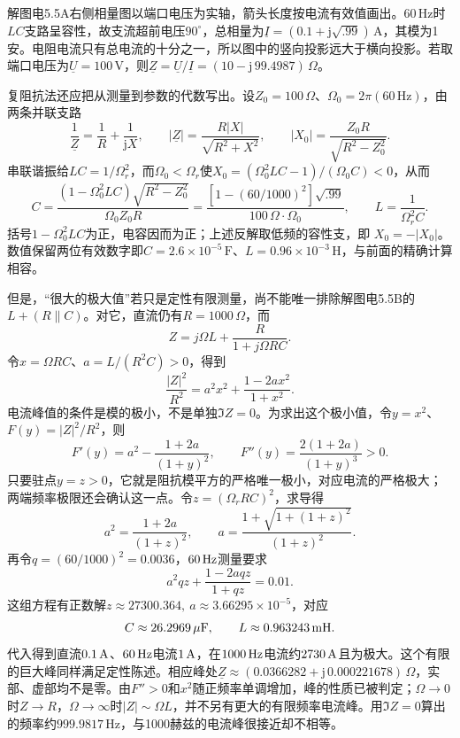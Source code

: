 \documentclass[UTF8,fontset=fandol,a4paper,11pt]{ctexart}
\begin{document}
解图电5.5A右侧相量图以端口电压为实轴，箭头长度按电流有效值画出。$60\,\mathrm{Hz}$时$LC$支路呈容性，故支流超前电压$90^\circ$，总相量为$\underline I=(0.1+\mathrm j\sqrt{.99})\,\mathrm A$，其模为1安。电阻电流只有总电流的十分之一，所以图中的竖向投影远大于横向投影。若取端口电压为$\underline U=100\,\mathrm V$，则$\underline Z=\underline U/\underline I=(10-\mathrm j\,99.4987)\,\Omega$。

复阻抗法还应把从测量到参数的代数写出。设$Z_0=100\,\Omega$、$\Omega_0=2\pi(60\,\mathrm{Hz})$，由两条并联支路
\[
\frac1{\underline Z}=\frac1R+\frac1{\mathrm jX},\qquad
|\underline Z|=\frac{R|X|}{\sqrt{R^2+X^2}},\qquad
|X_0|=\frac{Z_0R}{\sqrt{R^2-Z_0^2}}.
\]
串联谐振给$LC=1/\Omega_r^2$，而$\Omega_0<\Omega_r$使$X_0=(\Omega_0^2LC-1)/(\Omega_0C)<0$，从而
\[
C=\frac{(1-\Omega_0^2LC)\sqrt{R^2-Z_0^2}}{\Omega_0 Z_0R}
=\frac{[1-(60/1000)^2]\sqrt{.99}}{100\,\Omega\cdot\Omega_0},
\qquad L=\frac1{\Omega_r^2C}.
\]
括号$1-\Omega_0^2LC$为正，电容因而为正；上述反解取低频的容性支，即 $X_0=-|X_0|$。数值保留两位有效数字即$C=2.6\times10^{-5}\,\mathrm F$、$L=0.96\times10^{-3}\,\mathrm H$，与前面的精确计算相容。


但是，“很大的极大值”若只是定性有限测量，尚不能唯一排除解图电5.5B的$L+(R\parallel C)$。对它，直流仍有$R=1000\,\Omega$，而
\[
 Z=j\Omega L+\frac R{1+j\Omega RC}.
\]
令$x=\Omega RC$、$a=L/(R^2C)>0$，得到
\[
 \frac{|Z|^2}{R^2}=a^2x^2+\frac{1-2ax^2}{1+x^2}.
\]
电流峰值的条件是模的极小，不是单独$\Im Z=0$。为求出这个极小值，令$y=x^2$、$F(y)=|Z|^2/R^2$，则
\[
F'(y)=a^2-\frac{1+2a}{(1+y)^2},\qquad
F''(y)=\frac{2(1+2a)}{(1+y)^3}>0.
\]
只要驻点$y=z>0$，它就是阻抗模平方的严格唯一极小，对应电流的严格极大；两端频率极限还会确认这一点。令$z=(\Omega_rRC)^2$，求导得
\[
 a^2=\frac{1+2a}{(1+z)^2},\qquad
 a=\frac{1+\sqrt{1+(1+z)^2}}{(1+z)^2}.
\]
再令$q=(60/1000)^2=0.0036$，$60\,{\rm Hz}$测量要求
\[
 a^2qz+\frac{1-2aqz}{1+qz}=0.01 .
\]
这组方程有正数解$z\approx27300.364,\ a\approx3.66295\times10^{-5}$，对应
\[
 C\approx26.2969\,\mu{\rm F},\qquad L\approx0.963243\,{\rm mH}.
\]
代入得到直流$0.1\,{\rm A}$、$60\,{\rm Hz}$电流$1\,{\rm A}$，在$1000\,{\rm Hz}$电流约$2730\,{\rm A}$且为极大。这个有限的巨大峰同样满足定性陈述。相应峰处$\underline Z\approx(0.0366282+\mathrm j\,0.000221678)\,\Omega$，实部、虚部均不是零。由$F''>0$和$x^2$随正频率单调增加，峰的性质已被判定；$\Omega\to0$时$Z\to R$，$\Omega\to\infty$时$|Z|\sim\Omega L$，并不另有更大的有限频率电流峰。用$\Im Z=0$算出的频率约$999.9817\,\mathrm{Hz}$，与1000赫兹的电流峰很接近却不相等。
\end{document}
